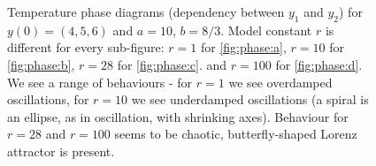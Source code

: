 \documentclass{llncs}
\begin{document}
\begin{figure}
\begin{minipage}{.49\linewidth}
  \end{minipage}
  \begin{minipage}{.49\linewidth}
    \centering
  \end{minipage}
  \caption{Temperature phase diagrams (dependency between $y_1$ and $y_2$) for $y(0)=(4,5,6)$ and $a=10$, $b=8/3$. Model constant $r$ is different for every sub-figure:
  $r=1$ for \ref{fig:phase:a}, $r=10$ for \ref{fig:phase:b}, $r=28$ for \ref{fig:phase:c}. and $r=100$ for \ref{fig:phase:d}. We see a range of behaviours - for $r=1$ we see overdamped
  oscillations, for $r=10$ we see underdamped oscillations (a spiral is an ellipse, as in oscillation, with shrinking axes). Behaviour for $r=28$ and $r=100$ seems to be chaotic, butterfly-shaped Lorenz attractor is present.}
\label{fig:phase}
\end{figure}
\end{document}

